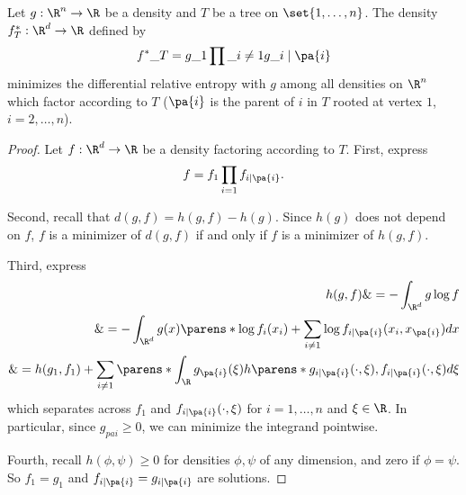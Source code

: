 \begin{proposition}
Let $g: \R ^n \to \R $ be a density and $T$ be a tree on $\set{1, \dots , n}$.
The density $f^*_T: \R ^d \to \R $ defined by
$$
f^*\_T = g\_1 \prod\_{i \neq 1} g\_{i \mid \pa{i}}
$$
minimizes the differential relative entropy with $g$ among all densities on $\R ^n$ which factor according to $T$ ($\pa{i}$ is the parent of $i$ in $T$ rooted at vertex $1$, $i = 2, \dots , n$).
\end{proposition}
\begin{proof}Let $f: \R ^d \to \R $ be a density factoring according to $T$.
First, express
    \[
f = f_1 \prod_{i = 1} f_{i \mid \pa{i}}.
    \]

Second, recall that $d(g, f) = h(g, f) - h(g)$.
Since $h(g)$ does not depend on $f$, $f$ is a minimizer of $d(g, f)$ if and only if $f$ is a minimizer of $h(g, f)$.

Third, express
    \[
\begin{aligned}
h(g, f) \&= - \int_{\R ^d} g \log f \\
\&= - \int_{\R ^d} g(x) \parens*{ \log f_{i}(x_i) + \sum_{i \neq 1} \log f_{i \mid \pa{i}}(x_i, x_{\pa{i}})} dx \\
\&= h(g_1, f_1) + \sum_{i \neq 1} \parens*{ \int_{\R } g_{\pa{i}}(\xi ) h\parens*{g_{i \mid \pa{i}}(\cdot , \xi ), f_{i\mid\pa{i}}(\cdot ,\xi )}d\xi }
\end{aligned}
    \]
which separates across $f_1$ and $f_{i \mid \pa{i}}(\cdot , \xi )$ for $i = 1, \dots , n$ and $\xi  \in \R $.
In particular, since $g_{pa{i}} \geq 0$, we can minimize the integrand pointwise.

Fourth, recall $h(\phi , \psi ) \geq 0$ for densities $\phi , \psi $ of any dimension, and zero if $\phi  = \psi $.
So $f_1 = g_1$ and $f_{i \mid \pa{i}} = g_{i \mid \pa{i}}$ are solutions.
\end{proof}
